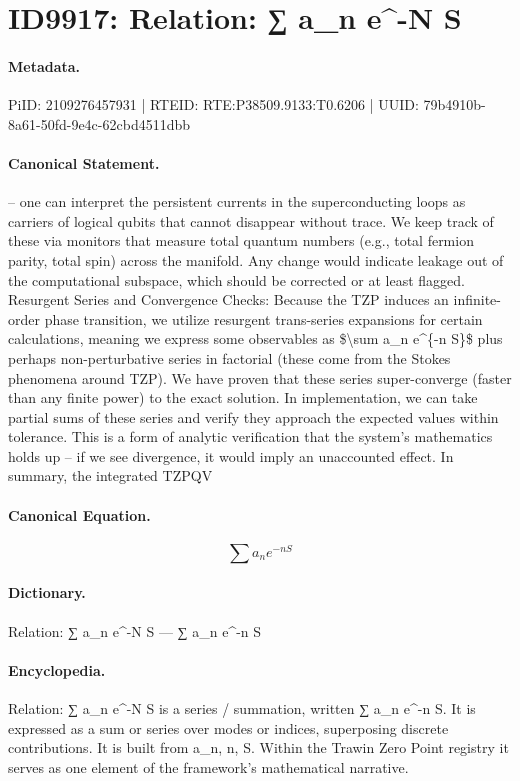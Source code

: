 \section*{ID9917: Relation: ∑ a\_n e\textasciicircum{}-N S}
\paragraph{Metadata.}
PiID: 2109276457931 | RTEID: RTE:P38509.9133:T0.6206 | UUID: 79b4910b-8a61-50fd-9e4c-62cbd4511dbb

\paragraph{Canonical Statement.}
– one can interpret the persistent currents in the superconducting loops as carriers of logical qubits that cannot disappear without trace. We keep track of these via monitors that measure total quantum numbers (e.g., total fermion parity, total spin) across the manifold. Any change would indicate leakage out of the computational subspace, which should be corrected or at least flagged. Resurgent Series and Convergence Checks: Because the TZP induces an infinite-order phase transition, we utilize resurgent trans-series expansions for certain calculations, meaning we express some observables as \$\textbackslash{}sum a\_n e\textasciicircum{}\{-n S\}\$ plus perhaps non-perturbative series in factorial (these come from the Stokes phenomena around TZP). We have proven that these series super-converge (faster than any finite power) to the exact solution. In implementation, we can take partial sums of these series and verify they approach the expected values within tolerance. This is a form of analytic verification that the system’s mathematics holds up – if we see divergence, it would imply an unaccounted effect. In summary, the integrated TZPQV

\paragraph{Canonical Equation.}
\[
\sum a_n e^{-n S}
\]

\paragraph{Dictionary.}
Relation: ∑ a\_n e\textasciicircum{}-N S — ∑ a\_n e\textasciicircum{}-n S

\paragraph{Encyclopedia.}
Relation: ∑ a\_n e\textasciicircum{}-N S is a series / summation, written ∑ a\_n e\textasciicircum{}-n S. It is expressed as a sum or series over modes or indices, superposing discrete contributions. It is built from a\_n, n, S. Within the Trawin Zero Point registry it serves as one element of the framework's mathematical narrative.
